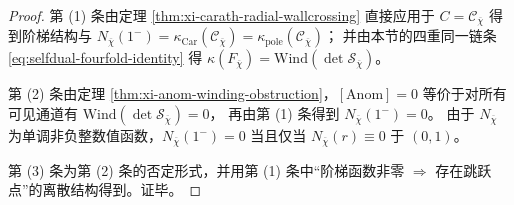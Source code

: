 \begin{proof}
第 (1) 条由定理 \ref{thm:xi-carath-radial-wallcrossing} 直接应用于 \(C=\mathscr{C}_{\overline\chi}\) 得到阶梯结构与 \(N_{\overline\chi}(1^-)=\kappa_{\mathrm{Car}}(\mathscr{C}_{\overline\chi})=\kappa_{\mathrm{pole}}(\mathscr{C}_{\overline\chi})\)；
并由本节的四重同一链条 \eqref{eq:selfdual-fourfold-identity} 得 \(\kappa(F_{\overline\chi})=\mathrm{Wind}(\det\mathcal S_{\overline\chi})\)。
\par
第 (2) 条由定理 \ref{thm:xi-anom-winding-obstruction}，\([\mathrm{Anom}]=0\) 等价于对所有可见通道有 \(\mathrm{Wind}(\det\mathcal S_{\overline\chi})=0\)，
再由第 (1) 条得到 \(N_{\overline\chi}(1^-)=0\)。
由于 \(N_{\overline\chi}\) 为单调非负整数值函数，\(N_{\overline\chi}(1^-)=0\) 当且仅当 \(N_{\overline\chi}(r)\equiv 0\) 于 \((0,1)\)。
\par
第 (3) 条为第 (2) 条的否定形式，并用第 (1) 条中“阶梯函数非零 \(\Rightarrow\) 存在跳跃点”的离散结构得到。证毕。
\end{proof}

